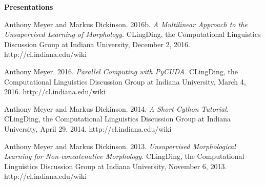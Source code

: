 \begin{singlespace}
\begin{description}
\end{description}
\thispagestyle{empty}
\centerline{\textbf{Presentations}}
\begin{description}
\item Anthony Meyer and Markus Dickinson. 2016b. \emph{A Multilinear Approach to the
Unsupervised Learning of Morphology.} CLingDing, the Computational Linguistics
Discussion Group at Indiana University, December 2, 2016.
http://cl.indiana.edu/wiki
\item  Anthony Meyer. 2016. \emph{Parallel Computing with PyCUDA.} CLingDing, the
Computational Linguistics Discussion Group at Indiana University, March 4,
2016. http://cl.indiana.edu/wiki
\item Anthony Meyer and Markus Dickinson. 2014. \emph{A Short Cython Tutorial.} CLingDing,
the Computational Linguistics Discussion Group at Indiana University, April 29,
2014. http://cl.indiana.edu/wiki
\item Anthony Meyer and Markus Dickinson. 2013. \emph{Unsupervised Morphological Learning
for Non-concatenative Morphology.} CLingDing, the Computational Linguistics
Discussion Group at Indiana University, November 6, 2013.
http://cl.indiana.edu/wiki
\end{description}
\vspace{18pt}






\end{singlespace}
